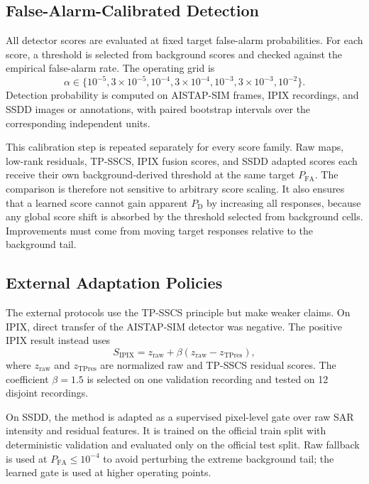 \documentclass[journal]{IEEEtran}
\begin{document}
\subsection{False-Alarm-Calibrated Detection}

All detector scores are evaluated at fixed target false-alarm probabilities. For each score, a threshold is selected from background scores and checked against the empirical false-alarm rate. The operating grid is
\begin{equation}
    \alpha \in \{10^{-5}, 3\times10^{-5}, 10^{-4}, 3\times10^{-4},
    10^{-3}, 3\times10^{-3}, 10^{-2}\}.
\end{equation}
Detection probability is computed on AISTAP-SIM frames, IPIX recordings, and SSDD images or annotations, with paired bootstrap intervals over the corresponding independent units.

This calibration step is repeated separately for every score family. Raw maps, low-rank residuals, TP-SSCS, IPIX fusion scores, and SSDD adapted scores each receive their own background-derived threshold at the same target $P_{\mathrm{FA}}$. The comparison is therefore not sensitive to arbitrary score scaling. It also ensures that a learned score cannot gain apparent $P_{\mathrm{D}}$ by increasing all responses, because any global score shift is absorbed by the threshold selected from background cells. Improvements must come from moving target responses relative to the background tail.

\subsection{External Adaptation Policies}

The external protocols use the TP-SSCS principle but make weaker claims. On IPIX, direct transfer of the AISTAP-SIM detector was negative. The positive IPIX result instead uses
\begin{equation}
    S_{\mathrm{IPIX}} = z_{\mathrm{raw}} + \beta
    (z_{\mathrm{raw}} - z_{\mathrm{TPres}}),
\end{equation}
where $z_{\mathrm{raw}}$ and $z_{\mathrm{TPres}}$ are normalized raw and TP-SSCS residual scores. The coefficient $\beta=1.5$ is selected on one validation recording and tested on 12 disjoint recordings.

On SSDD, the method is adapted as a supervised pixel-level gate over raw SAR intensity and residual features. It is trained on the official train split with deterministic validation and evaluated only on the official test split. Raw fallback is used at $P_{\mathrm{FA}} \leq 10^{-4}$ to avoid perturbing the extreme background tail; the learned gate is used at higher operating points.
\end{document}
